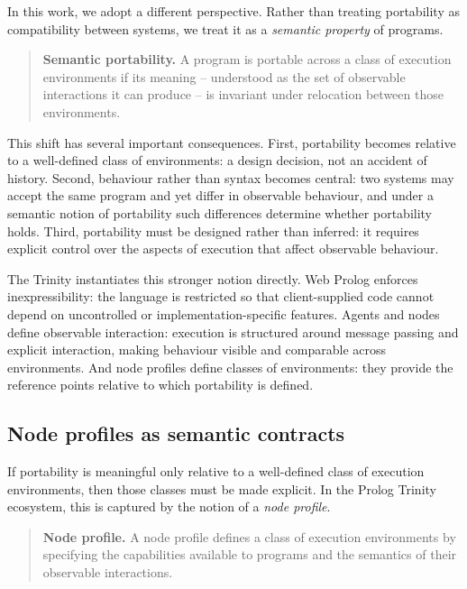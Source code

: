 In this work, we adopt a different perspective. Rather than treating
portability as compatibility between systems, we treat it as a
\emph{semantic property} of programs.

\begin{quote}
\normalsize \textbf{Semantic portability.} A program is portable across a class of
execution environments if its meaning -- understood as the set of
observable interactions it can produce -- is invariant under relocation
between those environments.
\end{quote}

\noindent This shift has several important consequences. First,
portability becomes relative to a well-defined class of environments: a
design decision, not an accident of history. Second, behaviour rather
than syntax becomes central: two systems may accept the same program and
yet differ in observable behaviour, and under a semantic notion of
portability such differences determine whether portability holds. Third,
portability must be designed rather than inferred: it requires explicit
control over the aspects of execution that affect observable behaviour.

The Trinity instantiates this stronger notion directly. Web Prolog
enforces inexpressibility: the language is restricted so that
client-supplied code cannot depend on uncontrolled or
implementation-specific features. Agents and nodes define observable
interaction: execution is structured around message passing and explicit
interaction, making behaviour visible and comparable across environments.
And node profiles define classes of environments: they provide the
reference points relative to which portability is defined.


\subsection{Node profiles as semantic contracts}\label{sec:node-profiles}

If portability is meaningful only relative to a well-defined class of
execution environments, then those classes must be made explicit. In the
Prolog Trinity ecosystem, this is captured by the notion of a
\emph{node profile}.

\begin{quote}
\normalsize \textbf{Node profile.} A node profile defines a class of execution
environments by specifying the capabilities available to programs and
the semantics of their observable interactions.
\end{quote}

